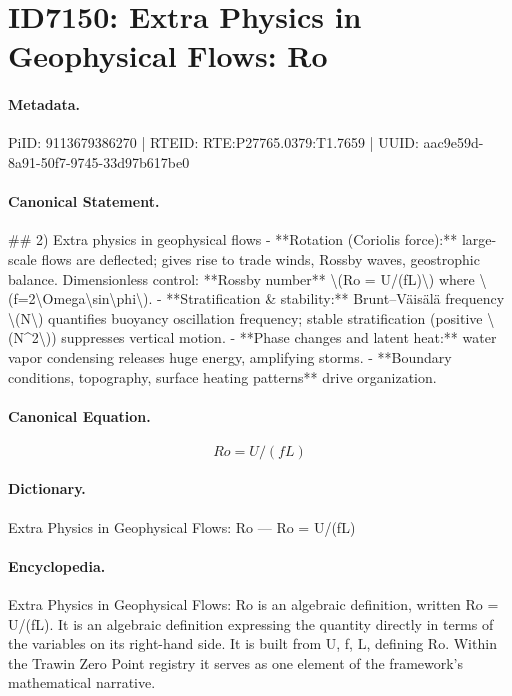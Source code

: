 \section*{ID7150: Extra Physics in Geophysical Flows: Ro}
\paragraph{Metadata.}
PiID: 9113679386270 | RTEID: RTE:P27765.0379:T1.7659 | UUID: aac9e59d-8a91-50f7-9745-33d97b617be0

\paragraph{Canonical Statement.}
\#\# 2) Extra physics in geophysical flows - **Rotation (Coriolis force):** large-scale flows are deflected; gives rise to trade winds, Rossby waves, geostrophic balance. Dimensionless control: **Rossby number** \textbackslash{}(Ro = U/(fL)\textbackslash{}) where \textbackslash{}(f=2\textbackslash{}Omega\textbackslash{}sin\textbackslash{}phi\textbackslash{}). - **Stratification \& stability:** Brunt–Väisälä frequency \textbackslash{}(N\textbackslash{}) quantifies buoyancy oscillation frequency; stable stratification (positive \textbackslash{}(N\textasciicircum{}2\textbackslash{})) suppresses vertical motion. - **Phase changes and latent heat:** water vapor condensing releases huge energy, amplifying storms. - **Boundary conditions, topography, surface heating patterns** drive organization.

\paragraph{Canonical Equation.}
\[
Ro = U/(fL)
\]

\paragraph{Dictionary.}
Extra Physics in Geophysical Flows: Ro — Ro = U/(fL)

\paragraph{Encyclopedia.}
Extra Physics in Geophysical Flows: Ro is an algebraic definition, written Ro = U/(fL). It is an algebraic definition expressing the quantity directly in terms of the variables on its right-hand side. It is built from U, f, L, defining Ro. Within the Trawin Zero Point registry it serves as one element of the framework's mathematical narrative.
